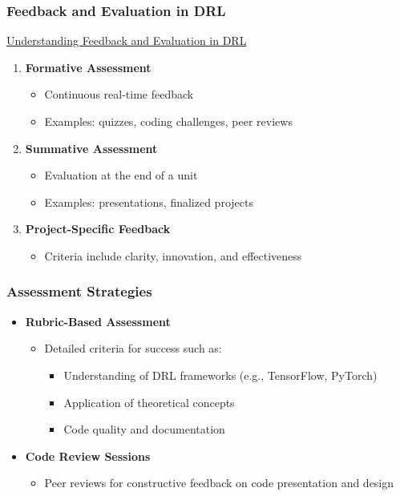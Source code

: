 \documentclass[aspectratio=169]{beamer}
\begin{document}
\begin{frame}[fragile]
  \frametitle{Feedback and Evaluation in DRL}
  
  \underline{Understanding Feedback and Evaluation in DRL}
  
  \begin{enumerate}
    \item \textbf{Formative Assessment}
      \begin{itemize}
        \item Continuous real-time feedback
        \item Examples: quizzes, coding challenges, peer reviews
      \end{itemize}
      
    \item \textbf{Summative Assessment}
      \begin{itemize}
        \item Evaluation at the end of a unit
        \item Examples: presentations, finalized projects
      \end{itemize}
      
    \item \textbf{Project-Specific Feedback}
      \begin{itemize}
        \item Criteria include clarity, innovation, and effectiveness
      \end{itemize}
  \end{enumerate}
\end{frame}

\begin{frame}[fragile]
  \frametitle{Assessment Strategies}

  \begin{itemize}
    \item \textbf{Rubric-Based Assessment}
      \begin{itemize}
        \item Detailed criteria for success such as:
          \begin{itemize}
            \item Understanding of DRL frameworks (e.g., TensorFlow, PyTorch)
            \item Application of theoretical concepts
            \item Code quality and documentation
          \end{itemize}
      \end{itemize}

    \item \textbf{Code Review Sessions}
      \begin{itemize}
        \item Peer reviews for constructive feedback on code presentation and design
      \end{itemize}
  \end{itemize}
\end{frame}
\end{document}
